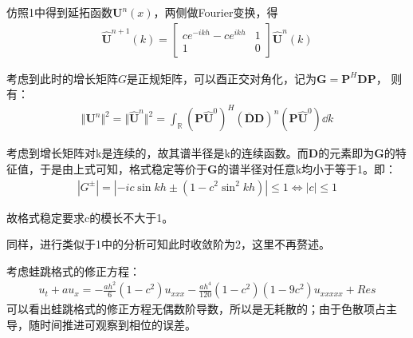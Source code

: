 \documentclass[12pt, a4paper]{article}
\begin{document}
仿照1中得到延拓函数$\textbf{U}^n(x)$，两侧做Fourier变换，得
\begin{align}
  \hat{\textbf{U}}^{n + 1}(k) = 
  \begin{bmatrix}
    ce^{-ikh} - ce^{ikh}  &1 \\
    1  &0
  \end{bmatrix}
  \hat{\textbf{U}}^n(k)
\end{align}

考虑到此时的增长矩阵$G$是正规矩阵，可以酉正交对角化，记为$\textbf{G} = \textbf{P}^{H}\textbf{D}\textbf{P}$，
则有：
\begin{align}
  \Vert \textbf{U}^n \Vert^2 = \Vert \hat{\textbf{U}}^n \Vert^2 = \int_\mathbb{R} (\textbf{P}\hat{\textbf{U}}^0)^H (\overline{\textbf{D}}\textbf{D})^n (\textbf{P}\hat{\textbf{U}}^0) \dd{k} 
\end{align}

考虑到增长矩阵对k是连续的，故其谱半径是k的连续函数。而$\textbf{D}$的元素即为$\textbf{G}$的特征值，于是由上式可知，格式稳定等价于$\textbf{G}$的谱半径对任意k均小于等于1。即：
\begin{align}
  |G^{\pm}| = |-ic\sin kh \pm (1 - c^2\sin^2kh)| \leqslant 1 \Leftrightarrow |c| \leqslant 1
\end{align}

故格式稳定要求c的模长不大于1。

同样，进行类似于1中的分析可知此时收敛阶为2，这里不再赘述。

考虑蛙跳格式的修正方程：
\begin{align}
  u_t + au_x = -\frac{ah^2}{6}(1 - c^2)u_{xxx} - \frac{ah^4}{120}(1-c^2)(1-9c^2)u_{xxxxx} + Res
\end{align}
可以看出蛙跳格式的修正方程无偶数阶导数，所以是无耗散的；由于色散项占主导，随时间推进可观察到相位的误差。
\end{document}
